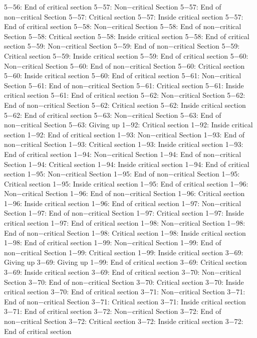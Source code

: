 5−56: End of critical section
5−57: Non−critical Section
5−57: End of non−critical Section
5−57: Critical section
5−57: Inside critical section
5−57: End of critical section
5−58: Non−critical Section
5−58: End of non−critical Section
5−58: Critical section
5−58: Inside critical section
5−58: End of critical section
5−59: Non−critical Section
5−59: End of non−critical Section
5−59: Critical section
5−59: Inside critical section
5−59: End of critical section
5−60: Non−critical Section
5−60: End of non−critical Section
5−60: Critical section
5−60: Inside critical section
5−60: End of critical section
5−61: Non−critical Section
5−61: End of non−critical Section
5−61: Critical section
5−61: Inside critical section
5−61: End of critical section
5−62: Non−critical Section
5−62: End of non−critical Section
5−62: Critical section
5−62: Inside critical section
5−62: End of critical section
5−63: Non−critical Section
5−63: End of non−critical Section
5−63: Giving up
1−92: Critical section
1−92: Inside critical section
1−92: End of critical section
1−93: Non−critical Section
1−93: End of non−critical Section
1−93: Critical section
1−93: Inside critical section
1−93: End of critical section
1−94: Non−critical Section
1−94: End of non−critical Section
1−94: Critical section
1−94: Inside critical section
1−94: End of critical section
1−95: Non−critical Section
1−95: End of non−critical Section
1−95: Critical section
1−95: Inside critical section
1−95: End of critical section
1−96: Non−critical Section
1−96: End of non−critical Section
1−96: Critical section
1−96: Inside critical section
1−96: End of critical section
1−97: Non−critical Section
1−97: End of non−critical Section
1−97: Critical section
1−97: Inside critical section
1−97: End of critical section
1−98: Non−critical Section
1−98: End of non−critical Section
1−98: Critical section
1−98: Inside critical section
1−98: End of critical section
1−99: Non−critical Section
1−99: End of non−critical Section
1−99: Critical section
1−99: Inside critical section
3−69: Giving up
3−69: Giving up
1−99: End of critical section
3−69: Critical section
3−69: Inside critical section
3−69: End of critical section
3−70: Non−critical Section
3−70: End of non−critical Section
3−70: Critical section
3−70: Inside critical section
3−70: End of critical section
3−71: Non−critical Section
3−71: End of non−critical Section
3−71: Critical section
3−71: Inside critical section
3−71: End of critical section
3−72: Non−critical Section
3−72: End of non−critical Section
3−72: Critical section
3−72: Inside critical section
3−72: End of critical section
